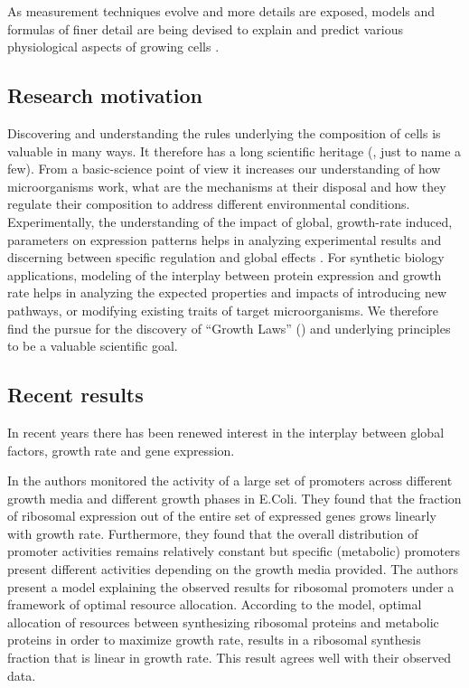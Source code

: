 \documentclass[a4page]{report}
\begin{document}
As measurement techniques evolve and more details are exposed, models and formulas of finer detail are being devised to explain and predict various physiological aspects of growing cells \cite{Scott2010b,Lerman2012,Karr2012}.
\subsection{Research motivation}
Discovering and understanding the rules underlying the composition of cells is valuable in many ways.
It therefore has a long scientific heritage (\cite{Schaechter1958, Maaloe1969, Bremer1987, Klumpp2009a}, just to name a few).
From a basic-science point of view it increases our understanding of how microorganisms work, what are the mechanisms at their disposal and how they regulate their composition to address different environmental conditions.
Experimentally, the understanding of the impact of global, growth-rate induced, parameters on expression patterns helps in analyzing experimental results and discerning between specific regulation and global effects \cite{loven2012}.
For synthetic biology applications, modeling of the interplay between protein expression and growth rate helps in analyzing the expected properties and impacts of introducing new pathways, or modifying existing traits of target microorganisms.
We therefore find the pursue for the discovery of ``Growth Laws'' (\cite{Scott2010b}) and underlying principles to be a valuable scientific goal.
\subsection{Recent results}
In recent years there has been renewed interest in the interplay between global factors, growth rate and gene expression.

In \cite{Zaslaver2009a} the authors monitored the activity of a large set of promoters across different growth media and different growth phases in E.Coli.
They found that the fraction of ribosomal expression out of the entire set of expressed genes grows linearly with growth rate.
Furthermore, they found that the overall distribution of promoter activities remains relatively constant but specific (metabolic) promoters present different activities depending on the growth media provided.
The authors present a model explaining the observed results for ribosomal promoters under a framework of optimal resource allocation.
According to the model, optimal allocation of resources between synthesizing ribosomal proteins and metabolic proteins in order to maximize growth rate, results in a ribosomal synthesis fraction that is linear in growth rate.
This result agrees well with their observed data.
\end{document}
